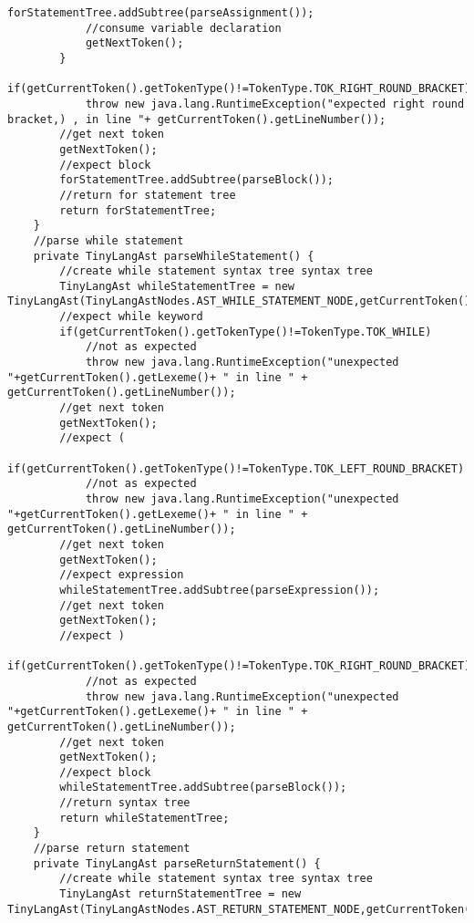 \begin{lstlisting}[basicstyle=\miniscule,caption=Implementation of recursive descent parser,label=listing:rescursive descent parser implementation]
			forStatementTree.addSubtree(parseAssignment());
			//consume variable declaration 
			getNextToken();
		}
		if(getCurrentToken().getTokenType()!=TokenType.TOK_RIGHT_ROUND_BRACKET)		
			throw new java.lang.RuntimeException("expected right round bracket,) , in line "+ getCurrentToken().getLineNumber());
		//get next token
		getNextToken();
		//expect block
		forStatementTree.addSubtree(parseBlock());
		//return for statement tree
		return forStatementTree;
	}
	//parse while statement
	private TinyLangAst parseWhileStatement() {
		//create while statement syntax tree syntax tree
		TinyLangAst whileStatementTree = new TinyLangAst(TinyLangAstNodes.AST_WHILE_STATEMENT_NODE,getCurrentToken().getLineNumber());
		//expect while keyword
		if(getCurrentToken().getTokenType()!=TokenType.TOK_WHILE)
			//not as expected
			throw new java.lang.RuntimeException("unexpected "+getCurrentToken().getLexeme()+ " in line " + getCurrentToken().getLineNumber());
		//get next token
		getNextToken();
		//expect (
		if(getCurrentToken().getTokenType()!=TokenType.TOK_LEFT_ROUND_BRACKET)
			//not as expected
			throw new java.lang.RuntimeException("unexpected "+getCurrentToken().getLexeme()+ " in line " + getCurrentToken().getLineNumber());
		//get next token
		getNextToken();
		//expect expression
		whileStatementTree.addSubtree(parseExpression());
		//get next token
		getNextToken();
		//expect )
		if(getCurrentToken().getTokenType()!=TokenType.TOK_RIGHT_ROUND_BRACKET)
			//not as expected
			throw new java.lang.RuntimeException("unexpected "+getCurrentToken().getLexeme()+ " in line " + getCurrentToken().getLineNumber());
		//get next token
		getNextToken();
		//expect block
		whileStatementTree.addSubtree(parseBlock());
		//return syntax tree
		return whileStatementTree;
	}
	//parse return statement
	private TinyLangAst parseReturnStatement() {
		//create while statement syntax tree syntax tree
		TinyLangAst returnStatementTree = new TinyLangAst(TinyLangAstNodes.AST_RETURN_STATEMENT_NODE,getCurrentToken().getLineNumber());


\end{lstlisting}
